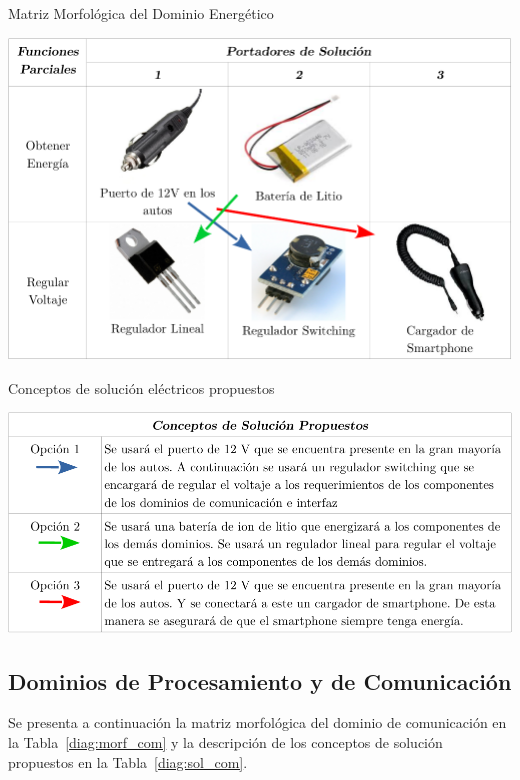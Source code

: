 \begin{table}[htbp!]
  \caption{Matriz Morfológica del Dominio Energético}
  \label{diag:morf_elec}
  \centering
  \includegraphics[width=0.9\linewidth]{morf_elec.pdf}
\end{table}


\begin{table}[htbp!]
  \caption{Conceptos de solución eléctricos propuestos}
  \label{diag:sol_elec}
  \centering
  \includegraphics[width=\linewidth]{sol_elec.pdf}
\end{table}

\subsection{Dominios de Procesamiento y de Comunicación}
Se presenta a continuación la matriz morfológica del dominio de comunicación en la Tabla~\ref{diag:morf_com} y la descripción de los conceptos de solución propuestos en la Tabla~\ref{diag:sol_com}.

